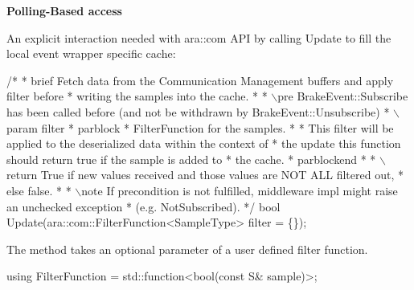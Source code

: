 \begin{DoxyItemize}
\item {\bfseries Polling-\/\+Based access}
\begin{DoxyItemize}
\item An explicit interaction needed with ara\+::com A\+PI by calling Update to fill the local event wrapper specific cache\+: 
\begin{DoxyCode}
\textcolor{comment}{/*}
\textcolor{comment}{* brief Fetch data from the Communication Management buffers and apply filter before}
\textcolor{comment}{* writing the samples into the cache.}
\textcolor{comment}{*}
\textcolor{comment}{* \(\backslash\)pre BrakeEvent::Subscribe has been called before (and not be withdrawn by BrakeEvent::Unsubscribe)}
\textcolor{comment}{* \(\backslash\)param filter}
\textcolor{comment}{*  parblock}
\textcolor{comment}{* FilterFunction for the samples.}
\textcolor{comment}{*}
\textcolor{comment}{* This filter will be applied to the deserialized data within the context of}
\textcolor{comment}{* the update this function should return true if the sample is added to}
\textcolor{comment}{* the cache.}
\textcolor{comment}{* parblockend}
\textcolor{comment}{*}
\textcolor{comment}{* \(\backslash\)return True if new values received and those values are NOT ALL filtered out,}
\textcolor{comment}{* else false.}
\textcolor{comment}{*}
\textcolor{comment}{* \(\backslash\)note If precondition is not fulfilled, middleware impl might raise an unchecked exception}
\textcolor{comment}{* (e.g. NotSubscribed).}
\textcolor{comment}{*/}
\textcolor{keywordtype}{bool} Update(ara::com::FilterFunction<SampleType> filter = \{\});
\end{DoxyCode}

\item The method takes an optional parameter of a user defined filter function. 
\begin{DoxyCode}
\textcolor{keyword}{using} FilterFunction = std::function<bool(const S& sample)>;
\end{DoxyCode}


\end{DoxyItemize}
\end{DoxyItemize}
